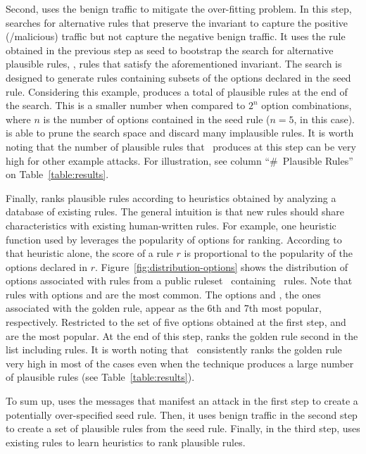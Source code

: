 \documentclass[conference]{IEEEtran}
\begin{document}
Second, \tname{} uses the benign traffic to mitigate the over-fitting
problem. In this step, \tname{} searches for alternative rules that
preserve the invariant to capture the positive (/malicious) traffic
but not capture the negative benign traffic. It uses the rule obtained
in the previous step as seed to bootstrap the search for alternative
plausible rules, \ie{}, rules that satisfy the aforementioned
invariant. The search is designed to generate rules containing subsets
of the options declared in the seed rule. Considering this example,
\tname{} produces a total of \pingscanplausible{} plausible rules at
the end of the search. This is a smaller number when compared to $2^n$
option combinations, where $n$ is the number of options contained in
the seed rule ($n=5$, in this case). \tname{} is able to prune the
search space and discard many implausible rules. It is worth noting
that the number of plausible rules that \tname\ produces at this step
can be very high for other example attacks. For illustration, see
column ``\#~Plausible Rules'' on Table~\ref{table:results}.


Finally, \tname{} ranks plausible rules according to heuristics
obtained by analyzing a database of existing rules. The general
intuition is that new rules should share characteristics with existing
human-written rules. For example, one heuristic function used by
\tname{} leverages the popularity of options for ranking. According to
that heuristic alone, the score of a rule $r$ is proportional to the
popularity of the options declared in
$r$. Figure~\ref{fig:distribution-options} shows the distribution of
options associated with rules from a public
ruleset~\cite{emerging-threats-open} containing
\numrulessuri\ rules. Note that rules with options 
and  are the most common. The options  and
, the ones associated with the golden rule, appear as
the 6th and 7th most popular, respectively. Restricted to the set of
five options obtained at the first step,  and
 are the most popular. At the end of this step, \tname{}
ranks the golden rule second in the list including
\pingscanplausible{} rules. It is worth noting that
\tname\ consistently ranks the golden rule very high in most of the
cases even when the technique produces a large number of plausible
rules (see Table~\ref{table:results}).

To sum up, \tname{} uses the messages that manifest an attack in the
first step to create a potentially over-specified seed rule. Then, it
uses benign traffic in the second step to create a set of plausible
rules from the seed rule. Finally, in the third step, \tname{} uses
existing rules to learn heuristics to rank plausible rules.
\end{document}
